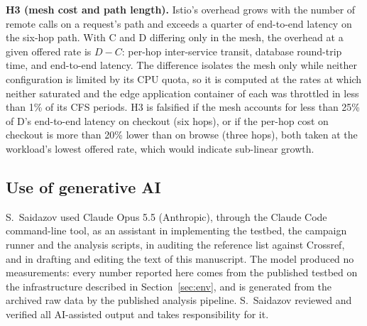 \textbf{H3 (mesh cost and path length).} Istio's overhead grows with the number of remote calls on a request's path and exceeds a quarter of end-to-end
latency on the six-hop path. With C and D differing only in the mesh, the overhead at a given offered rate is
$D - C$: per-hop inter-service transit, database round-trip time, and end-to-end latency. The difference isolates
the mesh only while neither configuration is limited by its CPU quota, so it is computed at the rates at which
neither saturated and the edge application container of each was throttled in less than 1\% of its CFS periods. H3 is falsified if the
mesh accounts for less than 25\% of D's end-to-end latency on checkout (six hops), or if the per-hop cost on
checkout is more than 20\% lower than on browse (three hops), both taken at the workload's lowest offered
rate, which would indicate sub-linear growth.

\subsection{Use of generative AI}
\label{sec:ai}
S.~Saidazov used Claude Opus 5.5 (Anthropic), through the Claude Code command-line tool, as an assistant in
implementing the testbed, the campaign runner and the analysis scripts, in auditing the reference list against
Crossref, and in drafting and editing the text of this manuscript. The model produced no measurements: every number reported here comes from
the published testbed on the infrastructure described in Section~\ref{sec:env}, and is generated from the archived
raw data by the published analysis pipeline. S.~Saidazov reviewed and verified all AI-assisted output and takes
responsibility for it.
